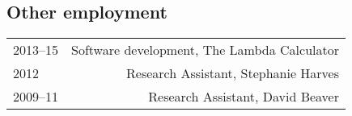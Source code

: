\documentclass[12pt]{article}
\begin{document}
\subsection*{Other employment}

\begin{longtable}{LR}
  2013--15   & Software development, The Lambda Calculator
               \\
  2012       & Research Assistant, Stephanie Harves\\
  2009--11   & Research Assistant, David Beaver
\end{longtable}


\end{document}
